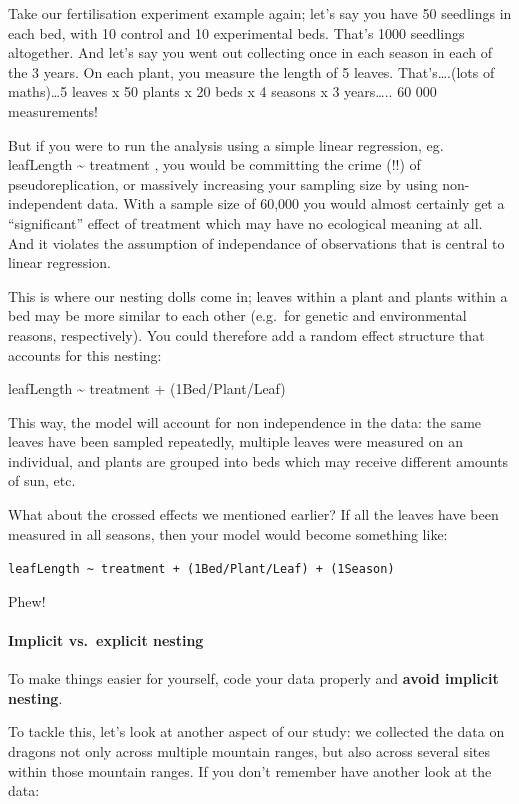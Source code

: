 \documentclass[
]{article}
\begin{document}
Take our fertilisation experiment example again; let's say you have 50
seedlings in each bed, with 10 control and 10 experimental beds. That's
1000 seedlings altogether. And let's say you went out collecting once in
each season in each of the 3 years. On each plant, you measure the
length of 5 leaves. That's\ldots.(lots of maths)\ldots5 leaves x 50
plants x 20 beds x 4 seasons x 3 years\ldots.. 60 000 measurements!

But if you were to run the analysis using a simple linear regression,
eg. leafLength \textasciitilde{} treatment , you would be committing the
crime (!!) of pseudoreplication, or massively increasing your sampling
size by using non-independent data. With a sample size of 60,000 you
would almost certainly get a ``significant'' effect of treatment which
may have no ecological meaning at all. And it violates the assumption of
independance of observations that is central to linear regression.

This is where our nesting dolls come in; leaves within a plant and
plants within a bed may be more similar to each other (e.g.~for genetic
and environmental reasons, respectively). You could therefore add a
random effect structure that accounts for this nesting:

leafLength \textasciitilde{} treatment + (1\textbar Bed/Plant/Leaf)

This way, the model will account for non independence in the data: the
same leaves have been sampled repeatedly, multiple leaves were measured
on an individual, and plants are grouped into beds which may receive
different amounts of sun, etc.

What about the crossed effects we mentioned earlier? If all the leaves
have been measured in all seasons, then your model would become
something like:

\texttt{leafLength\ \textasciitilde{}\ treatment\ +\ (1\textbar{}Bed/Plant/Leaf)\ +\ (1\textbar{}Season)}

Phew!

\paragraph{Implicit vs.~explicit
nesting}\label{implicit-vs.-explicit-nesting}

To make things easier for yourself, code your data properly and
\textbf{avoid implicit nesting}.

To tackle this, let's look at another aspect of our study: we collected
the data on dragons not only across multiple mountain ranges, but also
across several sites within those mountain ranges. If you don't remember
have another look at the data:
\end{document}
